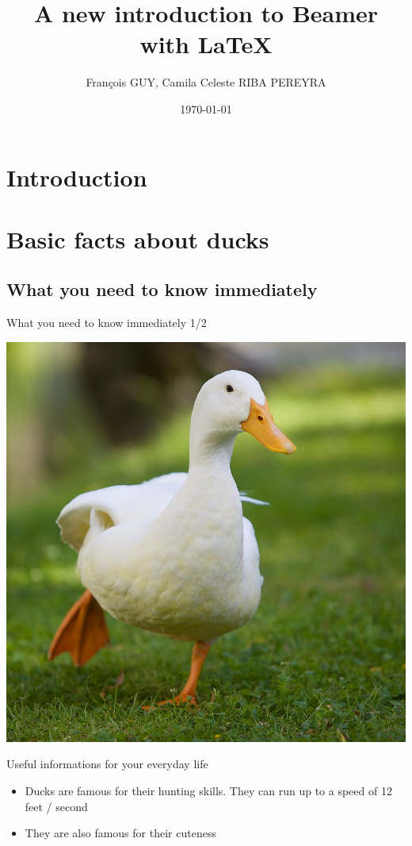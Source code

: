 \documentclass[11pt]{beamer}
\author{François GUY, Camila Celeste RIBA PEREYRA}
\title{A new introduction to Beamer with \LaTeX}
\institute{Université Savoie Mont Blanc, IS-Terre / IREGE}
\date{\today}
\begin{document}
\section{Introduction}
\begin{frame}[plain]
	\titlepage
\end{frame}

\begin{frame}
\tableofcontents
\end{frame}


\section{Basic facts about ducks}
\subsection{What you need to know immediately}
\begin{frame}{What you need to know immediately 1/2}
	\begin{center}
		\includegraphics[width = .4\textwidth]{runningduck.jpg}
	\end{center}
	\begin{block} {Useful informations for your everyday life}
		\begin{itemize}
			\pause
			\item Ducks are famous for their hunting skills. They can run up to a speed of 12 feet / second \cite{stewart1958locomotion}
			\pause
			\item They are also famous for their cuteness
		\end{itemize}
	\end{block}
\end{frame}
\end{document}
